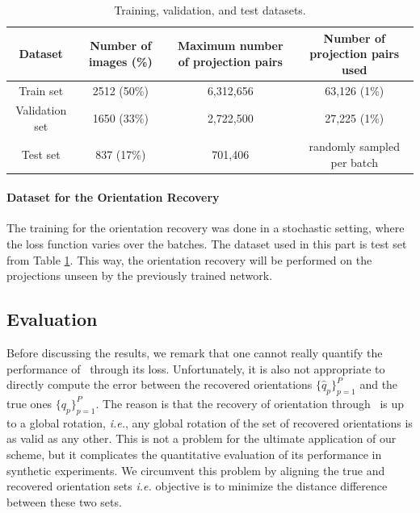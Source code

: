 \begin{table}
    \centering
    \begin{tabular}{c c c c}
        \toprule
        Dataset & Number of images (\%) & Maximum number of projection pairs & Number of projection pairs used \\ [0.5ex]
        \midrule
        Train set & 2512 (50\%) & 6,312,656 & 63,126 (1\%) \\
        Validation set & 1650 (33\%) & 2,722,500 & 27,225 (1\%) \\
        Test set & 837 (17\%) & 701,406 & randomly sampled per batch \\ [1ex]
        \bottomrule
    \end{tabular}
    \caption{Training, validation, and test datasets.}\label{table:dataset}
\end{table}


\paragraph{Dataset for the Orientation Recovery}
The training for the orientation recovery was done in a stochastic setting, where the loss function varies over the batches.
The dataset used in this part is test set from Table \ref{table:dataset}. This way, the orientation recovery will be performed on the projections unseen by the previously trained network.


\subsection{Evaluation}\label{sec:results:evaluation}



Before discussing the results, we remark that one cannot really quantify the performance of~ through its loss.
Unfortunately, it is also not appropriate to directly compute the error between the recovered orientations $\big\{\widehat{q}_p\big\}_{p=1}^P$ and the true ones $\big\{q_p\big\}_{p=1}^P$.
The reason is that the recovery of orientation through~ is up to a global rotation, \textit{i.e.}, any global rotation of the set of recovered orientations is as valid as any other.
This is not a problem for the ultimate application of our scheme, but it complicates the quantitative evaluation of its performance in synthetic experiments.
We circumvent this problem by aligning the true and recovered orientation sets \textit{i.e.} objective is to minimize the distance difference between these two sets.

